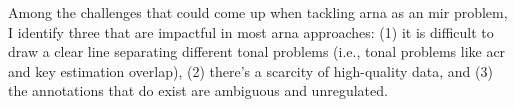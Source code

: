 

Among the challenges that could come up when tackling
\gls{arna} as an \gls{mir} problem, I identify three that
are impactful in most \gls{arna} approaches: (1) it is
difficult to draw a clear line separating different tonal
problems (i.e., tonal problems like \gls{acr} and key
estimation overlap), (2) there's a scarcity of high-quality
data, and (3) the annotations that do exist are ambiguous
and unregulated.
